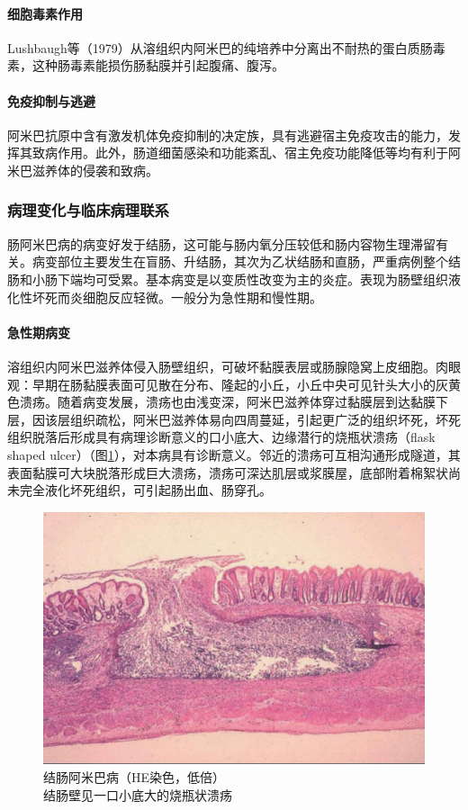 \paragraph{细胞毒素作用}
Lushbaugh等（1979）从溶组织内阿米巴的纯培养中分离出不耐热的蛋白质肠毒素，这种肠毒素能损伤肠黏膜并引起腹痛、腹泻。

\paragraph{免疫抑制与逃避}
阿米巴抗原中含有激发机体免疫抑制的决定族，具有逃避宿主免疫攻击的能力，发挥其致病作用。此外，肠道细菌感染和功能紊乱、宿主免疫功能降低等均有利于阿米巴滋养体的侵袭和致病。

\subsubsection{病理变化与临床病理联系}

肠阿米巴病的病变好发于结肠，这可能与肠内氧分压较低和肠内容物生理滞留有关。病变部位主要发生在盲肠、升结肠，其次为乙状结肠和直肠，严重病例整个结肠和小肠下端均可受累。基本病变是以变质性改变为主的炎症。表现为肠壁组织液化性坏死而炎细胞反应轻微。一般分为急性期和慢性期。

\paragraph{急性期病变}
溶组织内阿米巴滋养体侵入肠壁组织，可破坏黏膜表层或肠腺隐窝上皮细胞。肉眼观：早期在肠黏膜表面可见散在分布、隆起的小丘，小丘中央可见针头大小的灰黄色溃疡。随着病变发展，溃疡也由浅变深，阿米巴滋养体穿过黏膜层到达黏膜下层，因该层组织疏松，阿米巴滋养体易向四周蔓延，引起更广泛的组织坏死，坏死组织脱落后形成具有病理诊断意义的口小底大、边缘潜行的烧瓶状溃疡（flask
shaped
ulcer）（图\ref{fig15-1}），对本病具有诊断意义。邻近的溃疡可互相沟通形成隧道，其表面黏膜可大块脱落形成巨大溃疡，溃疡可深达肌层或浆膜屋，底部附着棉絮状尚未完全液化坏死组织，可引起肠出血、肠穿孔。

\begin{figure}[!htbp]
 \centering
 \includegraphics{./images/Image00244.jpg}
 \captionsetup{justification=centering}
 \caption{结肠阿米巴病（HE染色，低倍）\\ {\small 结肠壁见一口小底大的烧瓶状溃疡}}
\label{fig15-1}
  \end{figure}

